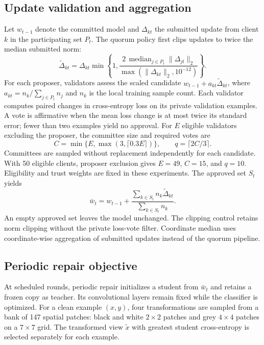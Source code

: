 
\subsection{Update validation and aggregation}
Let $w_{t-1}$ denote the committed model and $\Delta_{kt}$ the submitted update from client $k$ in the participating set $P_t$. The quorum policy first clips updates to twice the median submitted norm:
\begin{equation}
 \widetilde\Delta_{kt}=\Delta_{kt}\min\!\left\{1,
 \frac{2\,\operatorname{median}_{j\in P_t}\|\Delta_{jt}\|_2}
 {\max(\|\Delta_{kt}\|_2,10^{-12})}\right\}.
\end{equation}
For each proposer, validators assess the scaled candidate
$w_{t-1}+a_{kt}\widetilde\Delta_{kt}$, where
$a_{kt}=n_k/\sum_{j\in P_t}n_j$ and $n_k$ is the local training sample count.
Each validator computes paired changes in cross-entropy loss on its private validation examples. A vote is affirmative when the mean loss change is at most twice its standard error; fewer than two examples yield no approval. For $E$ eligible validators excluding the proposer, the committee size and required votes are
\begin{equation}
 C=\min\{E,\max(3,\lceil0.3E\rceil)\},\qquad q=\lceil2C/3\rceil.
\end{equation}
Committees are sampled without replacement independently for each candidate. With 50 eligible clients, proposer exclusion gives $E=49$, $C=15$, and $q=10$. Eligibility and trust weights are fixed in these experiments. The approved set $S_t$ yields
\begin{equation}
 \bar w_t=w_{t-1}+\frac{\sum_{k\in S_t}n_k\widetilde\Delta_{kt}}
 {\sum_{k\in S_t}n_k}.
\end{equation}
An empty approved set leaves the model unchanged. The clipping control retains norm clipping without the private loss-vote filter. Coordinate median uses coordinate-wise aggregation of submitted updates instead of the quorum pipeline.

\subsection{Periodic repair objective}
At scheduled rounds, periodic repair initializes a student from $\bar w_t$ and retains a frozen copy as teacher. Its convolutional layers remain fixed while the classifier is optimized. For a clean example $(x,y)$, four transformations are sampled from a bank of 147 spatial patches: black and white $2\times2$ patches and grey $4\times4$ patches on a $7\times7$ grid. The transformed view $\widetilde x$ with greatest student cross-entropy is selected separately for each example.

